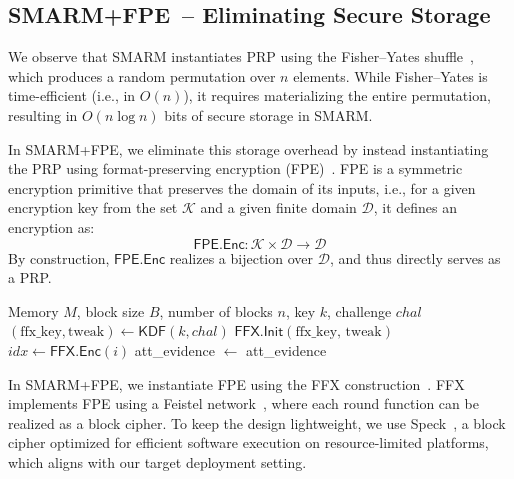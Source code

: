 \documentclass{ieeeaccess}
\newcommand{\rtsmarmtwo}{SMARM+FPE\xspace}
\begin{document}
\subsection{\rtsmarmtwo\ -- Eliminating Secure Storage}
\label{sec:rtsmarm-fpe}


We observe that SMARM instantiates PRP using the Fisher--Yates shuffle~\cite{fisherYates}, which produces a random permutation over $n$ elements.
While Fisher--Yates is time-efficient (i.e., in $O(n)$), it requires materializing the entire permutation, resulting in $O(n \log n)$ bits of secure storage in SMARM.

In \rtsmarmtwo, we eliminate this storage overhead by instead instantiating the PRP using format-preserving encryption (FPE)~\cite{bellare2009format,ff1}.
FPE is a symmetric encryption primitive that preserves the domain of its inputs, i.e., for a given encryption key from the set $\mathcal{K}$ and a given finite domain $\mathcal{D}$, it defines an encryption as:
\[
\mathsf{FPE.Enc}: \mathcal{K} \times \mathcal{D} \rightarrow \mathcal{D}
\]
By construction, $\mathsf{FPE.Enc}$ realizes a bijection over $\mathcal{D}$, and thus directly serves as a PRP.

\begin{algorithm}[!t]
\caption{\rtsmarmtwo (secure world)}
\label{alg:rtsmarm-fpe}
\begin{algorithmic}[1]
\small
\Notation Memory $M$, block size $B$, number of blocks $n$, key $k$, challenge $chal$
\State \colorbox{codehl}{$(\text{ffx\_key}, \text{tweak}) \gets \mathsf{KDF}(k, chal)$}
\State \colorbox{codehl}{$\mathsf{FFX.Init}(\text{ffx\_key, tweak})$}
\State {}
    \State \colorbox{codehl}{$idx \gets \mathsf{FFX.Enc}(i)$}
    \State {}
    \State {}
    \State {}
\EndFor
\State att\_evidence $\gets$ 
\Output att\_evidence
\end{algorithmic}
\end{algorithm}

In \rtsmarmtwo, we instantiate FPE using the FFX construction~\cite{bellare2010ffx}.
FFX implements FPE using a Feistel network~\cite{hoang2010generalized}, where each round function can be realized as a block cipher.
To keep the design lightweight, we use Speck~\cite{speck}, a block cipher optimized for efficient software execution on resource-limited platforms, which aligns with our target deployment setting.
\end{document}
